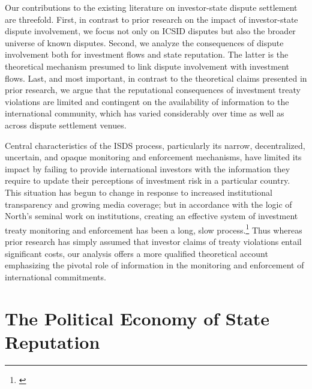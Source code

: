 \documentclass[12pt,onesided]{amsart}
\begin{document}
Our contributions to the existing literature on investor-state dispute settlement are threefold. First, in contrast to prior research on the impact of investor-state dispute involvement, we focus not only on ICSID disputes but also the broader universe of known disputes. Second, we analyze the consequences of dispute involvement both for investment flows and state reputation. The latter is the theoretical mechanism presumed to link dispute involvement with investment flows. Last, and most important, in contrast to the theoretical claims presented in prior research, we argue that the reputational consequences of investment treaty violations are limited and contingent on the availability of information to the international community, which has varied considerably over time as well as across dispute settlement venues.

Central characteristics of the ISDS process, particularly its narrow, decentralized, uncertain, and opaque monitoring and enforcement mechanisms, have limited its impact by failing to provide international investors with the information they require to update their perceptions of investment risk in a particular country. This situation has begun to change in response to increased institutional transparency and growing media coverage; but in accordance with the logic of North's seminal work on institutions, creating an effective system of investment treaty monitoring and enforcement has been a long, slow process.\footnote{\citet[p. 60]{north1990institutions}} Thus whereas prior research has simply assumed that investor claims of treaty violations entail significant costs, our analysis offers a more qualified theoretical account emphasizing the pivotal role of information in the monitoring and enforcement of international commitments.

\section*{The Political Economy of State Reputation}
\end{document}
